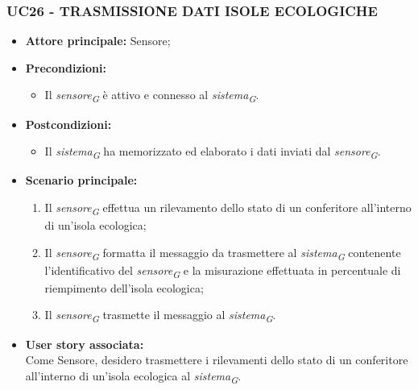\subsubsection{UC26 - TRASMISSIONE DATI ISOLE ECOLOGICHE}
\begin{itemize}
    \item \textbf{Attore principale:} Sensore;
    \item \textbf{Precondizioni:}
        \begin{itemize}
            \item Il \textit{sensore}\textsubscript{\textit{G}} è attivo e connesso al \textit{sistema}\textsubscript{\textit{G}}. 
        \end{itemize}
    \item \textbf{Postcondizioni:}
        \begin{itemize}
            \item Il \textit{sistema}\textsubscript{\textit{G}} ha memorizzato ed elaborato i dati inviati dal \textit{sensore}\textsubscript{\textit{G}}.
        \end{itemize}
    \item \textbf{Scenario principale:}
        \begin{enumerate}
            \item Il \textit{sensore}\textsubscript{\textit{G}} effettua un rilevamento dello stato di un conferitore all'interno di un'isola ecologica;
            \item Il \textit{sensore}\textsubscript{\textit{G}} formatta il messaggio da trasmettere al \textit{sistema}\textsubscript{\textit{G}} contenente l'identificativo del \textit{sensore}\textsubscript{\textit{G}} e la misurazione effettuata in percentuale di riempimento dell'isola ecologica;
            \item Il \textit{sensore}\textsubscript{\textit{G}} trasmette il messaggio al \textit{sistema}\textsubscript{\textit{G}}.
        \end{enumerate}
    \item \textbf{User story associata:} \\
    Come Sensore, desidero trasmettere i rilevamenti dello stato di un conferitore all'interno di un'isola ecologica al \textit{sistema}\textsubscript{\textit{G}}.
\end{itemize}

